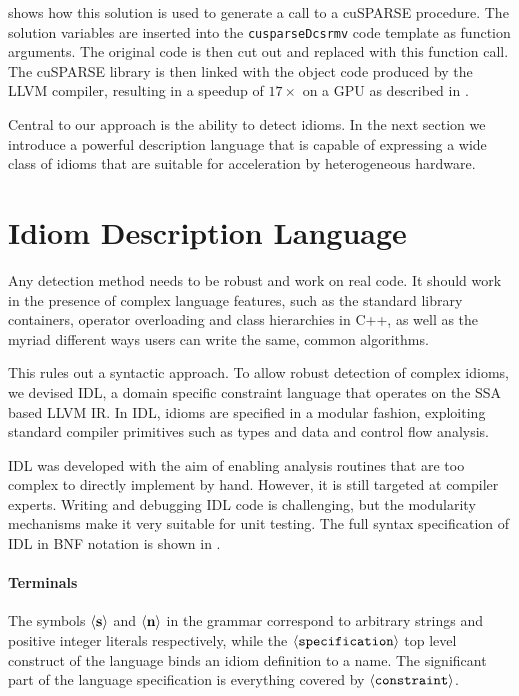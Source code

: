      shows how this solution is used to generate a
    call to a cuSPARSE procedure.
    The solution variables are inserted into the {\tt cusparseDcsrmv} code
    template as function arguments. 
    The original code is then cut out and replaced with this function call.
    The cuSPARSE library is then linked with the object code produced by the
    LLVM compiler, resulting in a speedup of $17\times$ on a GPU as described in
    .

    Central to our approach is the ability to detect idioms.
    In the next section we introduce a powerful description language that is
    capable of expressing a wide class of idioms that are suitable for
    acceleration by heterogeneous hardware.

\section{Idiom Description Language}
\label{sec:idl}

\begin{figure}[p]
    
    \label{fig:idlbnf}
\end{figure}

    Any detection method needs to be robust and work on real code.
    It should work in the presence of complex language features, such as the
    standard library containers, operator overloading and class hierarchies in
    C++, as well as the myriad different ways users can write the same, common
    algorithms.

    This rules out a syntactic approach.
    To allow robust detection of complex idioms, we devised IDL, a domain
    specific constraint language that operates on the SSA based LLVM IR.
    In IDL, idioms are specified in a modular fashion, exploiting standard
    compiler primitives such as types and data and control flow analysis.

    IDL was developed with the aim of enabling analysis routines that are too
    complex to directly implement by hand.
    However, it is still targeted at compiler experts.
    Writing and debugging IDL code is challenging, but the modularity mechanisms
    make it very suitable for unit testing.
    The full syntax specification of IDL in BNF notation is shown in
    .

    \paragraph{Terminals}
    The symbols $\left<\text{\bf s}\right>$ and $\left<\text{\bf n}\right>$ in
    the grammar correspond to arbitrary strings and positive integer literals
    respectively, while  the $\left<\text{\tt specification}\right>$ top level
    construct of the language binds an idiom definition to a name.
    The significant  part of the language specification is everything covered by
    $\left<\text{\tt constraint}\right>$.

